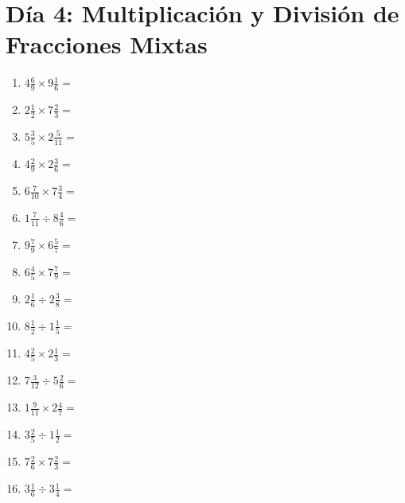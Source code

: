 \documentclass[12pt]{article}
\begin{document}
\section*{Día 4: Multiplicación y División de Fracciones Mixtas}
\begin{enumerate}
\item \large $ 4 \frac{6}{9} \times 9 \frac{1}{6} = $ \vspace{1.6cm}
\item \large $ 2 \frac{1}{2} \times 7 \frac{2}{3} = $ \vspace{1.6cm}
\item \large $ 5 \frac{3}{5} \times 2 \frac{5}{11} = $ \vspace{1.6cm}
\item \large $ 4 \frac{2}{9} \times 2 \frac{3}{6} = $ \vspace{1.6cm}
\item \large $ 6 \frac{7}{10} \times 7 \frac{3}{4} = $ \vspace{1.6cm}
\item \large $ 1 \frac{7}{11} \div 8 \frac{4}{6} = $ \vspace{1.6cm}
\item \large $ 9 \frac{7}{9} \times 6 \frac{5}{7} = $ \vspace{1.6cm}
\item \large $ 6 \frac{4}{5} \times 7 \frac{7}{9} = $ \vspace{1.6cm}
\item \large $ 2 \frac{1}{6} \div 2 \frac{3}{8} = $ \vspace{1.6cm}
\item \large $ 8 \frac{1}{2} \div 1 \frac{1}{5} = $ \vspace{1.6cm}
\newpage
\item \large $ 4 \frac{2}{5} \times 2 \frac{1}{3} = $ \vspace{1.6cm}
\item \large $ 7 \frac{3}{12} \div 5 \frac{2}{6} = $ \vspace{1.6cm}
\item \large $ 1 \frac{9}{11} \times 2 \frac{4}{7} = $ \vspace{1.6cm}
\item \large $ 3 \frac{2}{5} \div 1 \frac{1}{2} = $ \vspace{1.6cm}
\item \large $ 7 \frac{2}{6} \times 7 \frac{2}{3} = $ \vspace{1.6cm}
\item \large $ 3 \frac{1}{6} \div 3 \frac{1}{4} = $ \vspace{1.6cm}

\end{enumerate}
\end{document}
